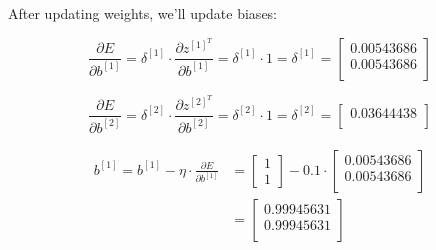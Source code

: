 \documentclass[12pt]{article}
\begin{document}
\begin{enumerate}[leftmargin=\labelsep]
        After updating weights, we'll update biases:

        \begin{equation*}
          \frac{\partial E}{\partial b^{[1]}} = \delta^{[1]} \cdot
          \frac{\partial z^{[1]^T}}{\partial b^{[1]}}
          = \delta^{[1]} \cdot 1
          = \delta^{[1]}
          = \begin{bmatrix}
            0.00543686 \\
            0.00543686 \\
          \end{bmatrix}
        \end{equation*}

        \begin{equation*}
          \frac{\partial E}{\partial b^{[2]}} = \delta^{[2]} \cdot
          \frac{\partial z^{[2]^T}}{\partial b^{[2]}}
          = \delta^{[2]} \cdot 1
          = \delta^{[2]}
          = \begin{bmatrix}
            0.03644438 \\
          \end{bmatrix}
        \end{equation*}

        \begin{equation*}
          \begin{aligned}
            b^{[1]} = b^{[1]} - \eta \cdot \frac{\partial E}{\partial b^{[1]}}
             & = \begin{bmatrix}
                   1 \\
                   1
                 \end{bmatrix} - 0.1 \cdot \begin{bmatrix}
                                             0.00543686 \\
                                             0.00543686 \\
                                           \end{bmatrix} \\
             & = \begin{bmatrix}
                   0.99945631 \\
                   0.99945631 \\
                 \end{bmatrix}
          \end{aligned}
        \end{equation*}


\end{enumerate}
\end{document}
